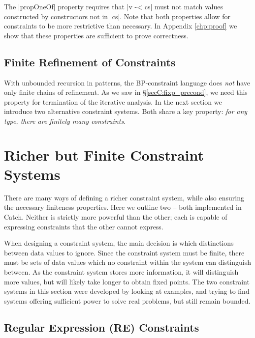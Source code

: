 \noindent The |propOneOf| property requires that |v -< cs| must not match values constructed by constructors not in |cs|. Note that both properties allow for constraints to be more restrictive than necessary. In Appendix \ref{chp:proof} we show that these properties are sufficient to prove correctness.

\subsection{Finite Refinement of Constraints}
\label{secC:bounded}

With unbounded recursion in patterns, the BP-constraint language does \textit{not} have only finite chains of refinement. As we saw in \S\ref{secC:fixp_precond}, we need this property for termination of the iterative analysis. In the next section we introduce two alternative constraint systems. Both share a key property: \textit{for any type, there are finitely many constraints}.



\section{Richer but Finite Constraint Systems}
\label{secC:constraint}

There are many ways of defining a richer constraint system, while also ensuring the necessary finiteness properties. Here we outline two -- both implemented in Catch. Neither is strictly more powerful than the other; each is capable of expressing constraints that the other cannot express.

When designing a constraint system, the main decision is which distinctions between data values to ignore. Since the constraint system must be finite, there must be sets of data values which no constraint within the system can distinguish between. As the constraint system stores more information, it will distinguish more values, but will likely take longer to obtain fixed points. The two constraint systems in this section were developed by looking at examples, and trying to find systems offering sufficient power to solve real problems, but still remain bounded.

\subsection{Regular Expression (RE) Constraints}
\label{secC:regexp}

